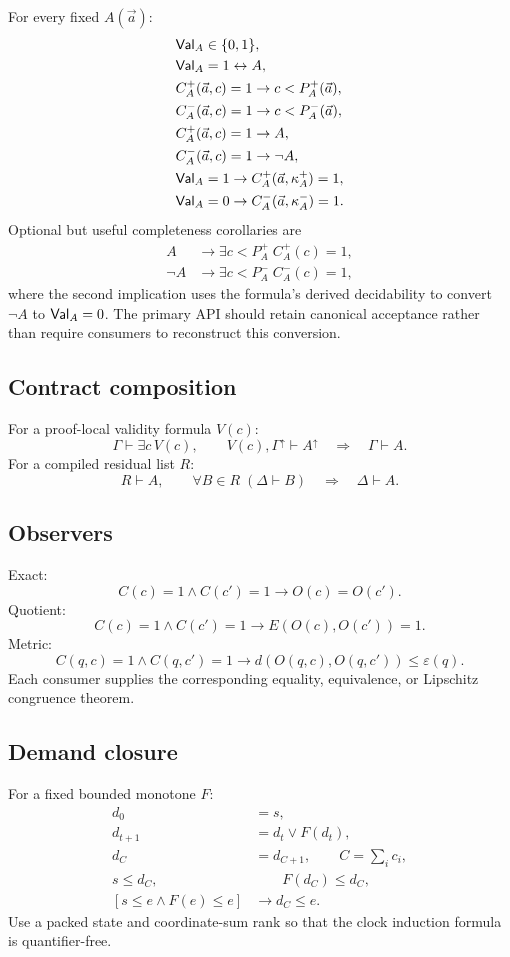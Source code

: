 For every fixed \(A(\vec a)\):
\begin{align*}
 &\mathsf{Val}_A\in\{0,1\},\\
 &\mathsf{Val}_A=1\leftrightarrow A,\\
 &C_A^+(\vec a,c)=1\to c<P_A^+(\vec a),\\
 &C_A^-(\vec a,c)=1\to c<P_A^-(\vec a),\\
 &C_A^+(\vec a,c)=1\to A,\\
 &C_A^-(\vec a,c)=1\to\neg A,\\
 &\mathsf{Val}_A=1\to C_A^+(\vec a,\kappa_A^+)=1,\\
 &\mathsf{Val}_A=0\to C_A^-(\vec a,\kappa_A^-)=1.
\end{align*}
Optional but useful completeness corollaries are
\begin{align*}
 A&\to\exists c<P_A^+\;C_A^+(c)=1,\\
 \neg A&\to\exists c<P_A^-\;C_A^-(c)=1,
\end{align*}
where the second implication uses the formula's derived decidability to convert
\(\neg A\) to \(\mathsf{Val}_A=0\).  The primary API should retain canonical acceptance
rather than require consumers to reconstruct this conversion.

\subsection{Contract composition}

For a proof-local validity formula \(V(c)\):
\[
 \Gamma\vdash\exists c\,V(c),
 \qquad
 V(c),\Gamma^\uparrow\vdash A^\uparrow
 \quad\Longrightarrow\quad
 \Gamma\vdash A.
\]
For a compiled residual list \(R\):
\[
 R\vdash A,
 \qquad
 \forall B\in R\;(\Delta\vdash B)
 \quad\Longrightarrow\quad
 \Delta\vdash A.
\]

\subsection{Observers}

Exact:
\[
 C(c)=1\wedge C(c')=1\to O(c)=O(c').
\]
Quotient:
\[
 C(c)=1\wedge C(c')=1\to E(O(c),O(c'))=1.
\]
Metric:
\[
 C(q,c)=1\wedge C(q,c')=1
 \to d(O(q,c),O(q,c'))\le\varepsilon(q).
\]
Each consumer supplies the corresponding equality, equivalence, or Lipschitz
congruence theorem.

\subsection{Demand closure}

For a fixed bounded monotone \(F\):
\begin{align*}
 d_{0}&=s,\\
 d_{t+1}&=d_t\vee F(d_t),\\
 d_C&=d_{C+1},\qquad C=\sum_i c_i,\\
 s\le d_C,&\qquad F(d_C)\le d_C,\\
 [s\le e\wedge F(e)\le e]&\to d_C\le e.
\end{align*}
Use a packed state and coordinate-sum rank so that the clock induction formula
is quantifier-free.
